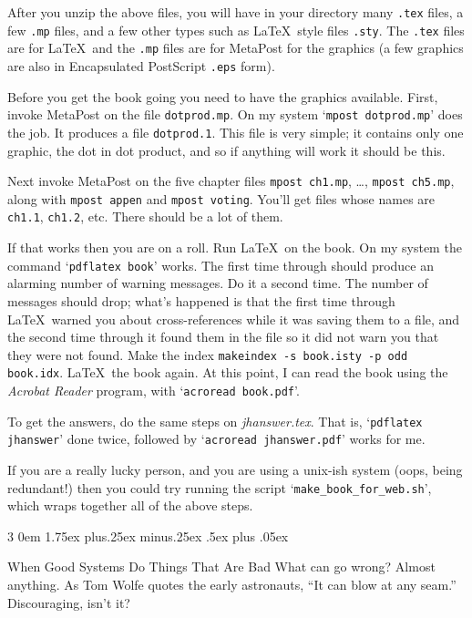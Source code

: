 \documentclass[titlepage]{article}
\makeatletter
\renewcommand{\subsubsection}{\@startsection{subsubsection}%
  {3}%
  {0em}%
  {1.75ex plus.25ex minus.25ex}%
  {.5ex plus .05ex}%
  {\bfseries\raggedright}}
\makeatother
\begin{document}
After you unzip the above files, you will have in your
directory many \texttt{.tex} files, a few \texttt{.mp} files, and 
a few other types such as \LaTeX\ style files \texttt{.sty}.
The \texttt{.tex} files are for \LaTeX\ and the \texttt{.mp} files
are for MetaPost for the graphics
(a few graphics are also in Encapsulated PostScript \texttt{.eps} form).

Before you get the book going you need to have the graphics available.
First, invoke MetaPost on the file \texttt{dotprod.mp}.
On my system `\texttt{mpost dotprod.mp}' does the job.
It produces a file \texttt{dotprod.1}.
This file is very simple; it contains only one graphic,
the dot in dot product, and so if anything will work it should be this.

Next invoke MetaPost on the five chapter files 
\verb!mpost ch1.mp!, \ldots, \verb!mpost ch5.mp!, 
along with \verb!mpost appen! and \verb!mpost voting!.
You'll get files whose names are \texttt{ch1.1}, \texttt{ch1.2}, etc.
There should be a lot of them.

If that works then you are on a roll.
Run \LaTeX\ on the book.
On my system the command `\verb!pdflatex book!' works.
The first time through should produce an alarming number of warning messages.
Do it a second time.
The number of messages should drop; what's happened is that the first time
through \LaTeX\ warned you about cross-references while it was saving them
to a file, and the second time through it found them in the file so it
did not warn you that they were not found.
Make the index \verb!makeindex -s book.isty -p odd book.idx!.
\LaTeX\ the book again. 
At this point, I can read the book using the \textit{Acrobat Reader} program, 
with `\verb!acroread book.pdf!'.

To get the answers, do the same steps on 
\textit{jhanswer.tex}.
That is, `\verb!pdflatex jhanswer!' done twice,
followed by `\verb!acroread jhanswer.pdf!' works for me.

If you are a really lucky person, and you are using a unix-ish system
(oops, being redundant!) then you could try running the script
`\verb!make_book_for_web.sh!', which wraps together all of the above steps.



\subsubsection{When Good Systems Do Things That Are Bad}
What can go wrong?   
Almost anything.
As Tom Wolfe quotes the early astronauts, ``It can blow at any seam.''
Discouraging, isn't it?
\end{document}
